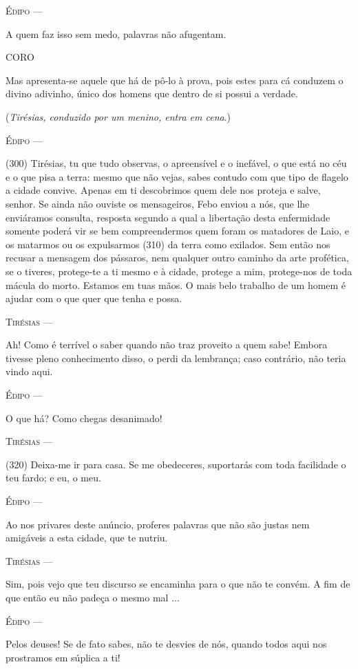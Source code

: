 \textsc{Édipo} ---

A quem faz isso sem medo, palavras não afugentam.

\textsc{CORO}

Mas apresenta-se aquele que há de pô-lo à prova, pois estes para cá
conduzem o divino adivinho, único dos homens que dentro de si possui a
verdade.

(\emph{Tirésias, conduzido por um menino, entra em cena}.)

\textsc{Édipo} ---

(300) Tirésias, tu que tudo observas, o apreensível e o inefável, o que
está no céu e o que pisa a terra: mesmo que não vejas, sabes contudo com
que tipo de flagelo a cidade convive. Apenas em ti descobrimos quem dele
nos proteja e salve, senhor. Se ainda não ouviste os mensageiros, Febo
enviou a nós, que lhe enviáramos consulta, resposta segundo a qual a
libertação desta enfermidade somente poderá vir se bem compreendermos
quem foram os matadores de Laio, e os matarmos ou os expulsarmos (310)
da terra como exilados. Sem então nos recusar a mensagem dos pássaros,
nem qualquer outro caminho da arte profética, se o tiveres, protege-te a
ti mesmo e à cidade, protege a mim, protege-nos de toda mácula do morto.
Estamos em tuas mãos. O mais belo trabalho de um homem é ajudar com o
que quer que tenha e possa.

\textsc{Tirésias} ---

Ah! Como é terrível o saber quando não traz proveito a quem sabe! Embora
tivesse pleno conhecimento disso, o perdi da lembrança; caso contrário,
não teria vindo aqui.

\textsc{Édipo} ---

O que há? Como chegas desanimado!

\textsc{Tirésias} ---

(320) Deixa-me ir para casa. Se me obedeceres, suportarás com toda
facilidade o teu fardo; e eu, o meu.

\textsc{Édipo} ---

Ao nos privares deste anúncio, proferes palavras que não são justas nem
amigáveis a esta cidade, que te nutriu.

\textsc{Tirésias} ---

Sim, pois vejo que teu discurso se encaminha para o que não te convém. A
fim de que então eu não padeça o mesmo mal ...

\textsc{Édipo} ---

Pelos deuses! Se de fato sabes, não te desvies de nós, quando todos aqui
nos prostramos em súplica a ti!

